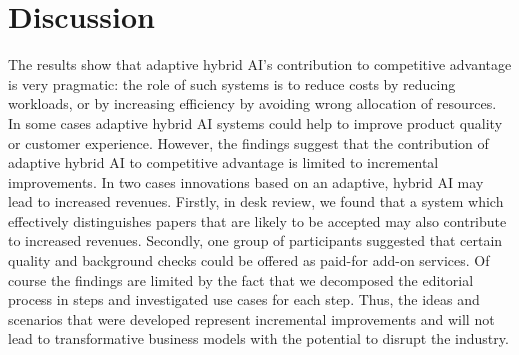 \section{Discussion}
\label{sec:discussion}

The results show that adaptive hybrid AI's contribution to competitive advantage is very pragmatic: the role of such systems 
is to reduce costs by reducing workloads, or by increasing efficiency by avoiding wrong allocation of resources. In some cases 
adaptive hybrid AI systems could help to improve product quality or customer experience. However, the findings suggest that 
the contribution of adaptive hybrid AI to competitive advantage is limited to incremental improvements. In two cases
innovations based on an adaptive, hybrid AI may lead to increased revenues. Firstly, in desk review, we found that a system which
effectively distinguishes papers that are likely to be accepted may also contribute to increased revenues. Secondly, one group 
of participants suggested that certain quality and background checks could be offered as paid-for add-on services.
Of course the findings are limited by the fact that we decomposed the editorial process in steps and investigated use cases
for each step. Thus, the ideas and scenarios that were developed represent incremental improvements and will not lead to 
transformative business models with the potential to disrupt the industry.

